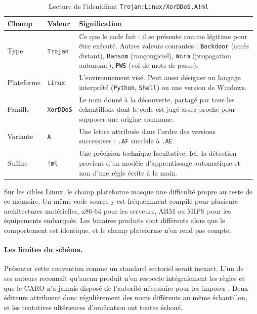 \begin{table}[h!]
\centering
\caption{Lecture de l'identifiant \texttt{Trojan:Linux/XorDDoS.A!ml}}
\label{tab:nommage}
\begin{tabular}{|l|l|p{7cm}|}
\hline
Champ & Valeur & Signification \\
\hline
Type & \texttt{Trojan} & Ce que le code fait : il se présente comme légitime pour être exécuté. Autres valeurs courantes : \texttt{Backdoor} (accès distant), \texttt{Ransom} (rançongiciel), \texttt{Worm} (propagation autonome), \texttt{PWS} (vol de mots de passe). \\
\hline
Plateforme & \texttt{Linux} & L'environnement visé. Peut aussi désigner un langage interprété (\texttt{Python}, \texttt{Shell}) ou une version de Windows. \\
\hline
Famille & \texttt{XorDDoS} & Le nom donné à la découverte, partagé par tous les échantillons dont le code est jugé assez proche pour supposer une origine commune. \\
\hline
Variante & \texttt{A} & Une lettre attribuée dans l'ordre des versions successives : \texttt{.AF} succède à \texttt{.AE}. \\
\hline
Suffixe & \texttt{!ml} & Une précision technique facultative. Ici, la détection provient d'un modèle d'apprentissage automatique et non d'une règle écrite à la main. \\
\hline
\end{tabular}
\end{table}

Sur les cibles Linux, le champ plateforme masque une difficulté propre au reste de ce mémoire. Un même code source y est fréquemment compilé pour plusieurs architectures matérielles, x86-64 pour les serveurs, ARM ou MIPS pour les équipements embarqués. Les binaires produits sont différents alors que le comportement est identique, et le champ plateforme n'en rend pas compte.

\paragraph{Les limites du schéma.} Présenter cette convention comme un standard sectoriel serait inexact. L'un de ses auteurs reconnaît qu'aucun produit n'en respecte intégralement les règles et que le CARO n'a jamais disposé de l'autorité nécessaire pour les imposer \cite{bontchev2005}. Deux éditeurs attribuent donc régulièrement des noms différents au même échantillon, et les tentatives ultérieures d'unification ont toutes échoué.

